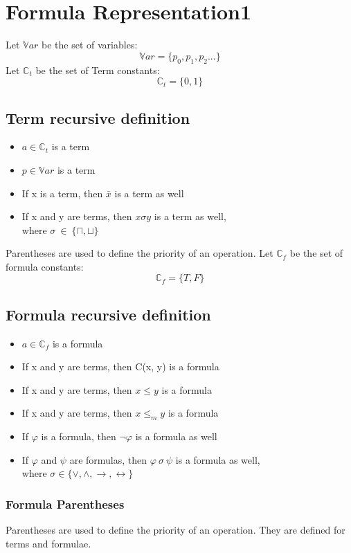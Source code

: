 \documentclass{article}
\begin{document}
	\newpage
	\section{Formula Representation1}
	Let $\mathbb{V}ar$ be the set of variables:
	\[ \mathbb{V}ar = \{p_0, p_1, p_2 ... \}\]
	Let $\mathbb{C}_t$ be the set of Term constants:
	\[ \mathbb{C}_t = \{0, 1 \}\]
	\subsection{Term recursive definition}
	\begin{itemize}
		\item $a \in \mathbb{C}_t$ is a term
		\item $p \in \mathbb{V}ar$ is a term
		\item If x is a term, then $\bar{x}$ is a term as well
		\item If x and y are terms, then $x \sigma y $ is a term as well,\\
			where $\sigma \: \in \: \{\sqcap, \sqcup\}$
	\end{itemize}
	Parentheses are used to define the priority of an operation.
	\newline
	Let $\mathbb{C}_f$ be the set of formula constants:
	\[ \mathbb{C}_f = \{T, F \}\]
	\subsection{Formula recursive definition}
	\begin{itemize}
		\item $a \in \mathbb{C}_f$ is a formula
		\item If x and y are terms, then C(x, y) is a formula
		\item If x and y are terms, then $x \le y$ is a formula
		\item If x and y are terms, then $x \le_m y$ is a formula
		\item If $\varphi$ is a formula, then $\neg \varphi$ is a formula as well
		\item If $\varphi$ and $\psi$ are formulas, then $\varphi \: \sigma \: \psi $ is a formula as well,\\
			where $\sigma \in \{\vee, \wedge, \rightarrow, \leftrightarrow\}$
	\end{itemize}

	\subsubsection*{Formula Parentheses}
		Parentheses are used to define the priority of an operation. They are defined for terms and formulae.
	
\end{document}
